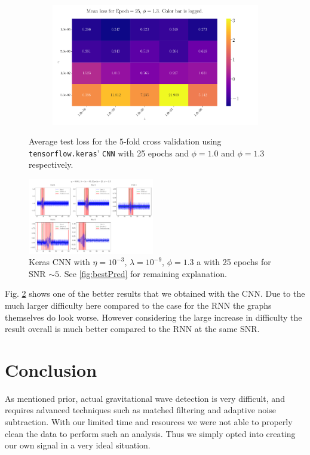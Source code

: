 \documentclass[%
reprint,
amsmath,amssymb,
aps,
]{revtex4-2}
\begin{document}
\begin{figure}[H]
\begin{subfigure}{0.499\textwidth}
	\end{subfigure}
	\newline
	\begin{subfigure}{0.499\textwidth}
		\includegraphics[width=\textwidth]{Figures/CNN_2D_Plot_Loss_Epoch25_Boost1.3.pdf}
	\end{subfigure}
	\caption{Average test loss for the $5$-fold cross validation using \texttt{tensorflow.keras}' \texttt{CNN} with 25 epochs and $\phi=1.0$ and $\phi=1.3$ respectively.}
	\label{fig:CNN_2D_Phi}
\end{figure}

\begin{figure}[H]
\includegraphics[width=0.49\textwidth]{Figures/CNN_Best_results.pdf}
\caption{Keras CNN with $\eta=10^{-3}$, $\lambda=10^{-9}$, $\phi=1.3$ a with 25 epochs for SNR $\sim5$. See \ref{fig:bestPred} for remaining explanation.}
\label{fig:CNN_best}
\end{figure}

Fig. \ref{fig:CNN_best} shows one of the better results that we obtained with the CNN. Due to the much larger difficulty here compared to the case for the RNN the graphs themselves do look worse. However considering the large increase in difficulty the result overall is much better compared to the RNN at the same SNR. 

\section{Conclusion}
As mentioned prior, actual gravitational wave detection is very difficult, and requires advanced techniques such as matched filtering and adaptive noise subtraction. With our limited time and resources we were not able to properly clean the data to perform such an analysis. Thus we simply opted into creating our own signal in a very ideal situation. 
\end{document}
